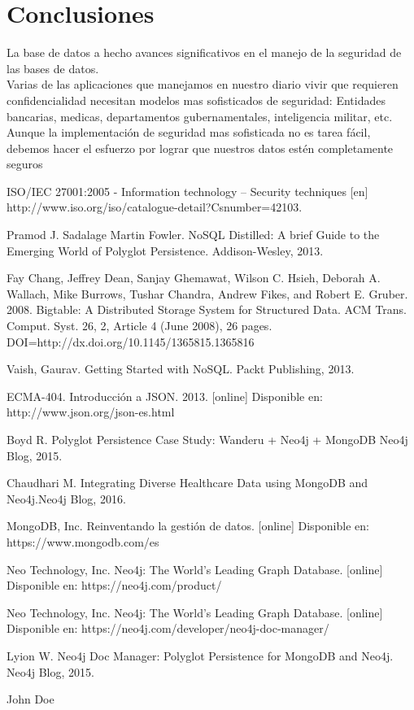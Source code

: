 \documentclass[conference]{IEEEtran}
\begin{document}
\section{Conclusiones}
  La base de datos a hecho avances significativos en el manejo de la seguridad de las bases de datos.
  \\
  Varias de las aplicaciones que manejamos en nuestro diario vivir que requieren confidencialidad necesitan modelos mas sofisticados de seguridad: Entidades bancarias, medicas, departamentos gubernamentales, inteligencia militar, etc.
  \\
  Aunque la implementación de seguridad mas sofisticada no es tarea fácil, debemos hacer el esfuerzo por lograr que nuestros datos estén completamente seguros


\ifCLASSOPTIONcaptionsoff
  \newpage
\fi


\begin{thebibliography}{1}

ISO/IEC 27001:2005 - Information technology -- Security    techniques [en]
\\
http://www.iso.org/iso/catalogue-detail?Csnumber=42103.

Pramod J. Sadalage Martin Fowler. NoSQL Distilled: A brief Guide to the Emerging
World of Polyglot Persistence. Addison-Wesley, 2013.

Fay Chang, Jeffrey Dean, Sanjay Ghemawat, Wilson C. Hsieh, Deborah A. Wallach, Mike Burrows, Tushar Chandra, Andrew Fikes, and Robert E. Gruber. 2008. Bigtable: A Distributed Storage System for Structured Data. ACM Trans. Comput. Syst. 26, 2, Article 4 (June 2008), 26 pages. DOI=http://dx.doi.org/10.1145/1365815.1365816

Vaish, Gaurav. Getting Started with NoSQL. Packt Publishing, 2013.

ECMA-404. Introducción a JSON. 2013. [online]
Disponible en: http://www.json.org/json-es.html

Boyd R. Polyglot Persistence Case Study: Wanderu + Neo4j + MongoDB Neo4j Blog, 2015.

Chaudhari M. Integrating Diverse Healthcare Data using MongoDB and Neo4j.Neo4j Blog, 2016.

MongoDB, Inc. Reinventando la gestión de datos. [online]
Disponible en: https://www.mongodb.com/es

Neo Technology, Inc. Neo4j: The World’s Leading Graph Database. [online]
Disponible en: https://neo4j.com/product/

Neo Technology, Inc. Neo4j: The World’s Leading Graph Database. [online]
Disponible en: https://neo4j.com/developer/neo4j-doc-manager/

Lyion W. Neo4j Doc Manager: Polyglot Persistence for MongoDB and Neo4j. Neo4j Blog, 2015.

\end{thebibliography}

\begin{IEEEbiography}{John Doe}
\blindtext
\end{IEEEbiography}
\end{document}
